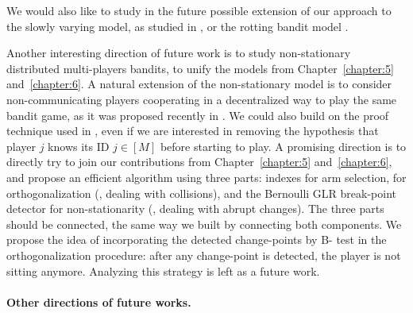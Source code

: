 We would also like to study in the future possible extension of our approach to the slowly varying model, as studied in \cite{Besbes14stochastic,Louedec16,WeiSrivastava18Abruptly}, or the rotting bandit model \cite{Seznec2018}.

Another interesting direction of future work is to study non-stationary distributed multi-players bandits, to unify the models from Chapter~\ref{chapter:5} and~\ref{chapter:6}.
A natural extension of the non-stationary model is to consider non-communicating players cooperating in a decentralized way to play the same bandit game, as it was proposed recently in \cite{WeiSrivastava18Distributed}.
%
We could also build on the proof technique used in \cite{WeiSrivastava18Abruptly}, even if we are interested in removing the hypothesis that player $j$ knows its ID $j\in[M]$ before starting to play.
%
A promising direction is to directly try to join our contributions from Chapter~\ref{chapter:5} and~\ref{chapter:6}, and propose an efficient algorithm using three parts:
\klUCB{} indexes for arm selection,
\MCTopM{} for orthogonalization (\ie, dealing with collisions),
and the Bernoulli GLR break-point detector for non-stationarity (\ie, dealing with abrupt changes).
The three parts should be connected, the same way we built \GLRklUCB{} by connecting both components.
We propose the idea of incorporating the detected change-points by B-\GLR{} test in the orthogonalization procedure: after any change-point is detected, the player is not sitting anymore.
Analyzing this strategy is left as a future work.



\paragraph{Other directions of future works.}

